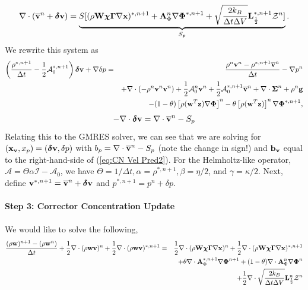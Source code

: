 \documentclass[final]{siamltex}
\def\Ab {{\bf A}}
\def\bb {{\bf b}}
\def\gb {{\bf g}}
\def\Lb {{\bf L}}
\def\vb {{\bf v}}
\def\wb {{\bf w}}
\def\Wb {{\bf W}}
\def\xb {{\bf x}}
\def\zb {{\bf z}}
\def\chib   {\boldsymbol{\chi}}
\def\deltab {\boldsymbol{\delta}}
\def\Gammab {\boldsymbol{\Gamma}}
\def\Phib   {\boldsymbol{\Phi}}
\def\Sigmab {\boldsymbol{\Sigma}}
\def\half   {\frac{1}{2}}
\begin{document}
{\begin{eqnarray}
\end{eqnarray}
\begin{equation}
\nabla\cdot(\overline\vb^n+\deltab\vb) = \underbrace{S[(\rho\Wb\chib\Gammab\nabla\xb)^{*,n+1} + \Ab_\Phi^n\nabla\Phib^{*,n+1} + \sqrt{\frac{2k_B}{\Delta t\Delta V}}\Lb_\half^{*,n+1}\mathcal{Z}^n]}_{S_p}.
\end{equation}
We rewrite this system as
\begin{eqnarray}
\left(\frac{\rho^{*,n+1}}{\Delta t} - \half\mathcal{A}_0^{*,n+1}\right)\deltab\vb + \nabla\delta p &=& \frac{\rho^n\vb^n-\rho^{*,n+1}\overline\vb^n}{\Delta t} -\nabla p^n\nonumber\\
&&+ \nabla\cdot(-\rho^n\vb^n\vb^n) + \half\mathcal{A}_0^n\vb^n + \half\mathcal{A}_0^{*,n+1}\overline\vb^n + \nabla\cdot\Sigmab^n + \rho^n\gb\nonumber\\
&&- (1-\theta)\left[\rho(\wb^T\zb)\nabla\Phib\right]^n - \theta\left[\rho(\wb^T\zb)\right]^n\nabla\Phib^{*,n+1},\label{eq:CN Vel Pred2}
\end{eqnarray}
\begin{equation}
-\nabla\cdot\deltab\vb = \nabla\cdot\overline\vb^n - S_p
\end{equation}
Relating this to the GMRES solver, we can see that we are solving for 
$(\xb_\vb,x_p) = (\deltab\vb,\delta p)$ with $b_p = \nabla\cdot\overline\vb^n-S_p$ (note the change in sign!) 
and $\bb_\vb$ equal to the right-hand-side of (\ref{eq:CN Vel Pred2}).  For the Helmholtz-like operator, 
$\mathcal{A}=\Theta\alpha\mathcal{I} - \mathcal{A}_0$, we have $\Theta=1/\Delta t, \alpha=\rho^{*,n+1}, 
\beta=\eta/2$, and $\gamma=\kappa/2$.
Next, define $\vb^{*,n+1} = \overline\vb^n + \deltab\vb$ and $p^{*,n+1} = p^n + \delta p$.\\ \\
{\bf Step 3: Corrector Concentration Update}\\ \\
We would like to solve the following,
\begin{eqnarray}
\frac{(\rho\wb)^{n+1} - (\rho\wb^n)}{\Delta t} + \half\nabla\cdot(\rho\wb\vb)^n + \half\nabla\cdot(\rho\wb\vb)^{*,n+1} &=&\half\nabla\cdot(\rho\Wb\chib\Gammab\nabla\xb)^n + \half\nabla\cdot(\rho\Wb\chib\Gammab\nabla\xb)^{*,n+1} \nonumber\\
&&\hspace{-2in} + \theta\nabla\cdot \Ab_\Phi^{*,n+1}\nabla\Phib^{n+1} +
(1-\theta)\nabla\cdot \Ab_\Phi^n\nabla\Phib^n\nonumber\\
&&\hspace{-2in} + \half\nabla\cdot\sqrt{\frac{2k_B}{\Delta t\Delta V}}\Lb_\half^n\mathcal{Z}^n

\end{eqnarray}}
\end{document}

